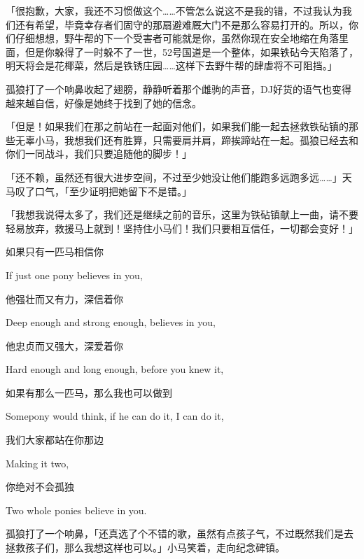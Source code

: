 「{\rt 很抱歉，大家，我还不习惯做这个……不管怎么说这不是我的错，不过我认为我们还有希望，毕竟幸存者们固守的那扇避难厩大门不是那么容易打开的。所以，你们仔细想想，野牛帮的下一个受害者可能就是你，虽然你现在安全地缩在角落里面，但是你躲得了一时躲不了一世，52号国道是一个整体，如果铁砧今天陷落了，明天将会是花椰菜，然后是铁锈庄园……这样下去野牛帮的肆虐将不可阻挡。}」

孤狼打了一个响鼻收起了翅膀，静静听着那个雌驹的声音，DJ好货的语气也变得越来越自信，好像是她终于找到了她的信念。

「{\rt 但是！如果我们在那之前站在一起面对他们，如果我们能一起去拯救铁砧镇的那些无辜小马，我想我们还有胜算，只需要肩并肩，蹄挨蹄站在一起。孤狼已经去和你们一同战斗，我们只要追随他的脚步！}」

「还不赖，虽然还有很大进步空间，不过至少她没让他们能跑多远跑多远……」天马叹了口气，「至少证明把她留下不是错。」

「{\rt 我想我说得太多了，我们还是继续之前的音乐，这里为铁砧镇献上一曲，请不要轻易放弃，救援马上就到！坚持住小马们！我们只要相互信任，一切都会变好！}」


\begin{song}
    如果只有一匹马相信你
    
    If just one pony believes in you,
    
    \medskip

    他强壮而又有力，深信着你
    
    Deep enough and strong enough, believes in you,
    
    \medskip

    他忠贞而又强大，深爱着你
    
    Hard enough and long enough, before you knew it,
    
    \medskip

    如果有那么一匹马，那么我也可以做到
    
    Somepony would think, if he can do it, I can do it,
    
    \medskip

    我们大家都站在你那边
    
    Making it two,
    
    \medskip

    你绝对不会孤独
    
    Two whole ponies believe in you.
\end{song}

孤狼打了一个响鼻，「还真选了个不错的歌，虽然有点孩子气，不过既然我们是去拯救孩子们，那么我想这样也可以。」小马笑着，走向纪念碑镇。

